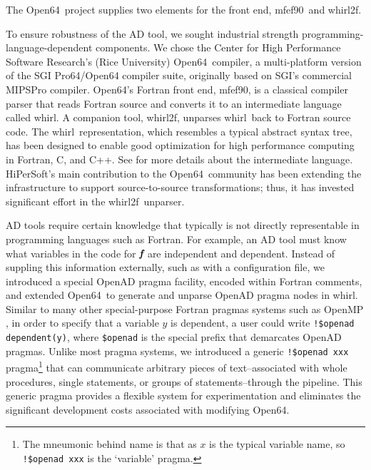 \documentclass[11pt]{article}
\newcommand{\mfefninety}{mfef90}
\newcommand{\OpenSixtyFour}{Open64}
\newcommand{\whirl}{whirl}
\newcommand{\whirlTof}{whirl2f}
\newcommand{\bmf}{\mbox{\bf\em f}}
\newcommand{\code}[1]{{\small\tt{#1}}}
\begin{document}
The \OpenSixtyFour\ project \cite{open64Web} supplies two elements for
the front end, \mfefninety\ and \whirlTof.

To ensure robustness of the AD tool, we sought industrial strength
programming-language-dependent components.  We chose the Center for
High Performance Software Research's (Rice University) \OpenSixtyFour\
compiler, a multi-platform version of the SGI Pro64/Open64 compiler
suite, originally based on SGI's commercial MIPSPro compiler.
\OpenSixtyFour's Fortran front end, \mfefninety, is a classical
compiler parser that reads Fortran source and converts it to an
intermediate language called \whirl.  A companion tool, \whirlTof,
unparses \whirl\ back to Fortran source code.  The \whirl\
representation, which resembles a typical abstract syntax tree, has
been designed to enable good optimization for high performance
computing in Fortran, C, and C++. See \cite{open64Web} for more
details about the intermediate language.  HiPerSoft's main
contribution to the \OpenSixtyFour\ community has been extending the
infrastructure to support source-to-source transformations; thus, it
has invested significant effort in the \whirlTof\ unparser.

AD tools require certain knowledge that typically is not directly
representable in programming languages such as Fortran.  For example,
an AD tool must know what variables in the code for $\bmf$ are
independent and dependent.  Instead of suppling this information
externally, such as with a configuration file, we introduced a special
OpenAD pragma facility, encoded within Fortran comments, and extended
\OpenSixtyFour\ to generate and unparse OpenAD pragma nodes in \whirl.
Similar to many other special-purpose Fortran pragmas systems such as
OpenMP \cite{OpenMP-website}, in order to specify that a variable
$y$ is dependent, a user could write \code{!\$openad dependent(y)},
where \code{\$openad} is the special prefix that demarcates OpenAD
pragmas.  Unlike most pragma systems, we introduced a generic
\code{!\$openad xxx} pragma\footnote{The mneumonic behind name is that
as $x$ is the typical variable name, so \code{!\$openad xxx} is the
`variable' pragma.} that can communicate arbitrary pieces of
text--associated with whole procedures, single statements, or groups
of statements--through the pipeline.  This generic pragma provides a
flexible system for experimentation and eliminates the significant
development costs associated with modifying \OpenSixtyFour.


\end{document}
